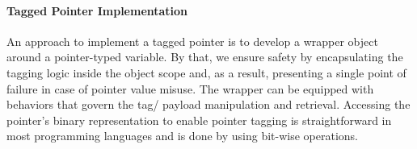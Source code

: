 \paragraph{Tagged Pointer Implementation}

An approach to implement a tagged pointer is to develop a wrapper object around a pointer-typed variable. By that, we ensure safety by encapsulating the tagging logic inside the object scope and, as a result, presenting a single point of failure in case of pointer value misuse. The wrapper can be equipped with behaviors that govern the tag/ payload manipulation and retrieval. Accessing the pointer's binary representation to enable pointer tagging is straightforward in most programming languages and is done by using bit-wise operations. \\

\clearpage